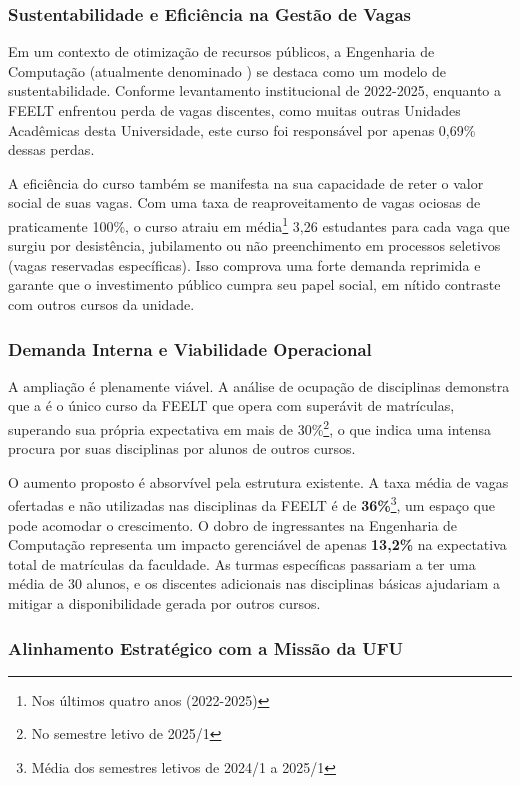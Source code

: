 \subsubsection*{Sustentabilidade e Eficiência na Gestão de Vagas}

Em um contexto de otimização de recursos públicos, a Engenharia de Computação (atualmente denominado \ppccurso) se destaca como um modelo de sustentabilidade. Conforme levantamento institucional de 2022-2025, enquanto a FEELT enfrentou perda de vagas discentes, como muitas outras Unidades Acadêmicas desta Universidade, este curso foi responsável por apenas 0,69\% dessas perdas.

A eficiência do curso também se manifesta na sua capacidade de reter o valor social de suas vagas. Com uma taxa de reaproveitamento de vagas ociosas de praticamente 100\%, o curso atraiu em média\footnote{Nos últimos quatro anos (2022-2025)} 3,26 estudantes para cada vaga que surgiu por desistência, jubilamento ou não preenchimento em processos seletivos (vagas reservadas específicas). Isso comprova uma forte demanda reprimida e garante que o investimento público cumpra seu papel social, em nítido contraste com outros cursos da unidade.

\subsubsection*{Demanda Interna e Viabilidade Operacional}

A ampliação é plenamente viável. A análise de ocupação de disciplinas demonstra que a \ppccurso é o único curso da FEELT que opera com superávit de matrículas, superando sua própria expectativa em mais de 30\%\footnote{No semestre letivo de 2025/1}, o que indica uma intensa procura por suas disciplinas por alunos de outros cursos.

O aumento proposto é absorvível pela estrutura existente. A taxa média de vagas ofertadas e não utilizadas nas disciplinas da FEELT é de \textbf{36\%}\footnote{Média dos semestres letivos de 2024/1 a 2025/1}, um espaço que pode acomodar o crescimento. O dobro de ingressantes na Engenharia de Computação representa um impacto gerenciável de apenas \textbf{13,2\%} na expectativa total de matrículas da faculdade. As turmas específicas passariam a ter uma média de 30 alunos, e os discentes adicionais nas disciplinas básicas ajudariam a mitigar a disponibilidade gerada por outros cursos.

\subsubsection*{Alinhamento Estratégico com a Missão da UFU}

